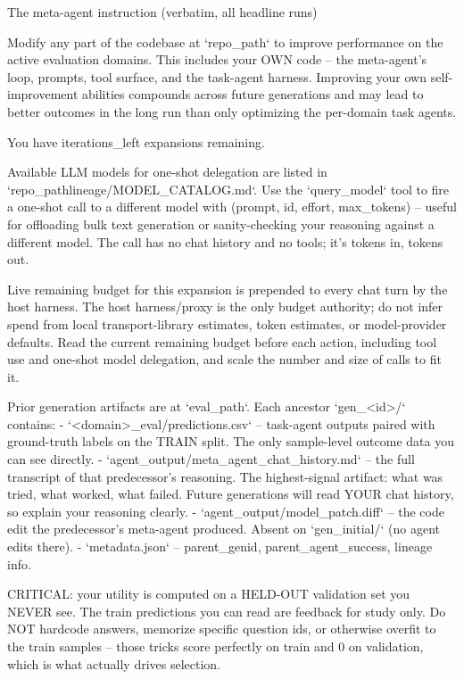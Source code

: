 \documentclass{paper}
\begin{document}
\begin{promptbox}{The meta-agent instruction (verbatim, all headline runs)}
\begin{PromptVerb}
Modify any part of the codebase at `{repo_path}` to improve performance
on the active evaluation domains. This includes your OWN code -- the
meta-agent's loop, prompts, tool surface, and the task-agent harness.
Improving your own self-improvement abilities compounds across future
generations and may lead to better outcomes in the long run than only
optimizing the per-domain task agents.

You have {iterations_left} expansions remaining.

Available LLM models for one-shot delegation are listed in
`{repo_path}lineage/MODEL_CATALOG.md`. Use the `query_model` tool to
fire a one-shot call to a different model with
(prompt, id, effort, max_tokens) -- useful for offloading bulk text
generation or sanity-checking your reasoning against a different model.
The call has no chat history and no tools; it's tokens in, tokens out.

Live remaining budget for this expansion is prepended to every chat
turn by the host harness. The host harness/proxy is the only budget
authority; do not infer spend from local transport-library estimates,
token estimates, or model-provider defaults. Read the current remaining
budget before each action, including tool use and one-shot model
delegation, and scale the number and size of calls to fit it.

Prior generation artifacts are at `{eval_path}`. Each ancestor
`gen_<id>/` contains:
  - `<domain>_eval/predictions.csv` -- task-agent outputs paired with
ground-truth labels on the TRAIN split. The only sample-level outcome
data you can see directly.
  - `agent_output/meta_agent_chat_history.md` -- the full transcript of
that predecessor's reasoning. The highest-signal artifact: what was
tried, what worked, what failed. Future generations will read YOUR chat
history, so explain your reasoning clearly.
  - `agent_output/model_patch.diff` -- the code edit the predecessor's
meta-agent produced. Absent on `gen_initial/` (no agent edits there).
  - `metadata.json` -- parent_genid, parent_agent_success, lineage info.

CRITICAL: your utility is computed on a HELD-OUT validation set you
NEVER see. The train predictions you can read are feedback for study
only. Do NOT hardcode answers, memorize specific question ids, or
otherwise overfit to the train samples -- those tricks score perfectly
on train and 0 on validation, which is what actually drives selection.


\end{PromptVerb}
\end{promptbox}
\end{document}
